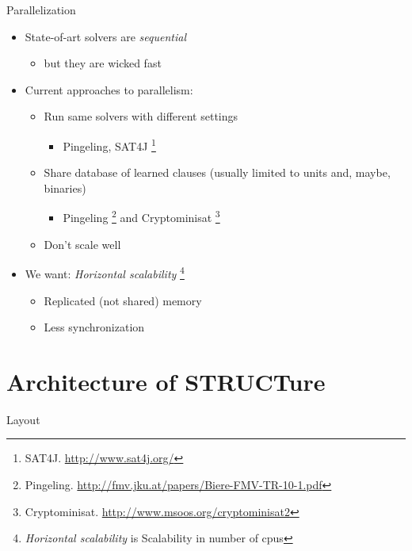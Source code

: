 \documentclass[mathserif,serif]{beamer}
\begin{document}
\begin{frame}{Parallelization}
  \begin{itemize}
    \item State-of-art solvers are \emph{sequential}
    \begin{itemize}
      \item but they are wicked fast
    \end{itemize}
    \item Current approaches to parallelism:
    \begin{itemize}
      \item Run same solvers with different settings
      \begin{itemize}
        \item Pingeling, SAT4J \footnote{SAT4J. \url{http://www.sat4j.org/}}
      \end{itemize}
      \item Share database of learned clauses (usually limited to units and,
      maybe, binaries)
      \begin{itemize}
        \item Pingeling \footnote{Pingeling. \url{http://fmv.jku.at/papers/Biere-FMV-TR-10-1.pdf}}
        and Cryptominisat \footnote{Cryptominisat.  \url{http://www.msoos.org/cryptominisat2}}
      \end{itemize}
      \item Don't scale well
    \end{itemize}

    \item We want: \emph{Horizontal scalability}
    \footnote{\emph{Horizontal scalability} is Scalability in number of cpus}
    \begin{itemize}
      \item Replicated (not shared) memory
      \item Less synchronization
    \end{itemize}
  \end{itemize}
\end{frame}


\section{Architecture of STRUCTure}

\begin{frame}{Layout}
  \tableofcontents[currentsection]
\end{frame}
\end{document}
